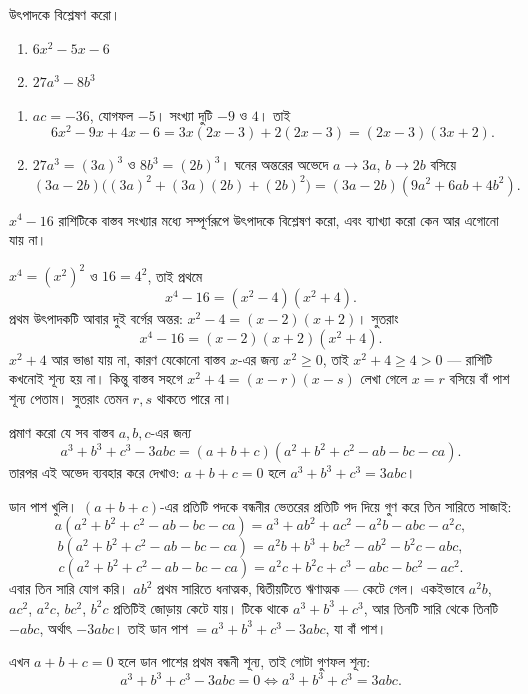 \documentclass[11pt]{article}
\begin{document}
 উৎপাদকে বিশ্লেষণ করো।
\begin{enumerate}
  \item $6x^{2} - 5x - 6$
  \item $27a^{3} - 8b^{3}$
\end{enumerate}

\begin{sol}
\begin{enumerate}
  \item $ac = -36$, যোগফল $-5$। সংখ্যা দুটি $-9$ ও $4$। তাই
        \[
          6x^{2} - 9x + 4x - 6 = 3x(2x - 3) + 2(2x - 3) = (2x - 3)(3x + 2).
        \]
  \item $27a^{3} = (3a)^{3}$ ও $8b^{3} = (2b)^{3}$। ঘনের অন্তরের অভেদে
        $a \to 3a$, $b \to 2b$ বসিয়ে
        \[
          (3a - 2b)\big( (3a)^{2} + (3a)(2b) + (2b)^{2} \big)
          = (3a - 2b)(9a^{2} + 6ab + 4b^{2}).
        \]
\end{enumerate}
\end{sol}

 $x^{4} - 16$ রাশিটিকে বাস্তব সংখ্যার মধ্যে সম্পূর্ণরূপে উৎপাদকে
বিশ্লেষণ করো, এবং ব্যাখ্যা করো কেন আর এগোনো যায় না।

\begin{sol}
$x^{4} = (x^{2})^{2}$ ও $16 = 4^{2}$, তাই প্রথমে
\[
  x^{4} - 16 = (x^{2} - 4)(x^{2} + 4).
\]
প্রথম উৎপাদকটি আবার দুই বর্গের অন্তর: $x^{2} - 4 = (x-2)(x+2)$। সুতরাং
\[
  x^{4} - 16 = (x - 2)(x + 2)(x^{2} + 4).
\]
$x^{2} + 4$ আর ভাঙা যায় না, কারণ যেকোনো বাস্তব $x$-এর জন্য $x^{2} \geq 0$,
তাই $x^{2} + 4 \geq 4 > 0$ --- রাশিটি কখনোই শূন্য হয় না। কিন্তু বাস্তব সহগে
$x^{2} + 4 = (x - r)(x - s)$ লেখা গেলে $x = r$ বসিয়ে বাঁ পাশ শূন্য পেতাম।
সুতরাং তেমন $r, s$ থাকতে পারে না।
\end{sol}

 প্রমাণ করো যে সব বাস্তব $a, b, c$-এর জন্য
\[
  a^{3} + b^{3} + c^{3} - 3abc = (a + b + c)(a^{2} + b^{2} + c^{2} - ab - bc - ca).
\]
তারপর এই অভেদ ব্যবহার করে দেখাও: $a + b + c = 0$ হলে $a^{3} + b^{3} + c^{3} = 3abc$।

\begin{sol}
ডান পাশ খুলি। $(a+b+c)$-এর প্রতিটি পদকে বন্ধনীর ভেতরের প্রতিটি পদ দিয়ে গুণ করে
তিন সারিতে সাজাই:
\[
  a(a^{2} + b^{2} + c^{2} - ab - bc - ca)
  = a^{3} + ab^{2} + ac^{2} - a^{2}b - abc - a^{2}c,
\]
\[
  b(a^{2} + b^{2} + c^{2} - ab - bc - ca)
  = a^{2}b + b^{3} + bc^{2} - ab^{2} - b^{2}c - abc,
\]
\[
  c(a^{2} + b^{2} + c^{2} - ab - bc - ca)
  = a^{2}c + b^{2}c + c^{3} - abc - bc^{2} - ac^{2}.
\]
এবার তিন সারি যোগ করি। $ab^{2}$ প্রথম সারিতে ধনাত্মক, দ্বিতীয়টিতে ঋণাত্মক ---
কেটে গেল। একইভাবে $a^{2}b$, $ac^{2}$, $a^{2}c$, $bc^{2}$, $b^{2}c$ প্রতিটিই
জোড়ায় কেটে যায়। টিকে থাকে $a^{3} + b^{3} + c^{3}$, আর তিনটি সারি থেকে তিনটি
$-abc$, অর্থাৎ $-3abc$। তাই ডান পাশ $= a^{3} + b^{3} + c^{3} - 3abc$, যা বাঁ পাশ।

এখন $a + b + c = 0$ হলে ডান পাশের প্রথম বন্ধনী শূন্য, তাই গোটা গুণফল শূন্য:
\[
  a^{3} + b^{3} + c^{3} - 3abc = 0 \iff a^{3} + b^{3} + c^{3} = 3abc .
\]
\end{sol}
\end{document}
